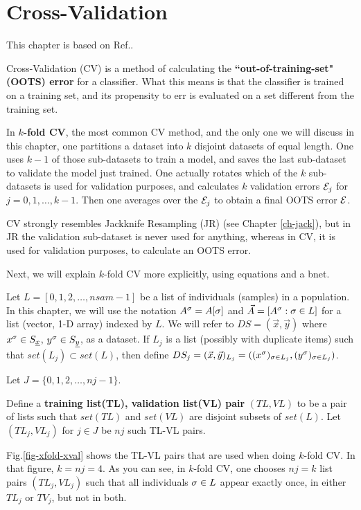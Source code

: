 \chapter{Cross-Validation}
\label{ch-cross-val}

This chapter is based on Ref.\cite{wiki-xval}.

Cross-Validation (CV)
is a method 
of calculating the 
{\bf ``out-of-training-set" (OOTS) error}
for a classifier.
What this means is that the classifier 
is trained on a training set,
and its propensity to err is evaluated
on a set different from the training set.

In {\bf $k$-fold CV}, the most common CV method, 
and the only one we will discuss in this chapter,
one
partitions a  
dataset into $k$ disjoint datasets
of equal length.
One uses $k-1$ of those
sub-datasets to train a model,
and saves the last sub-dataset to
validate the model just trained.
One actually rotates which of 
the $k$ sub-datasets is used 
for validation purposes,
and calculates $k$ validation 
errors ${\cal E}_j$ for $j=0, 1, \ldots, k-1$.
Then one averages over the ${\cal E}_j$
to obtain a final OOTS error ${\cal E}$. 

CV strongly resembles
Jackknife
Resampling (JR) 
(see Chapter \ref{ch-jack}),
but in JR 
the validation sub-dataset is
never used for anything,
whereas in CV,
it is used for validation
purposes, to calculate
an OOTS error.

Next, we will
explain $k$-fold CV more explicitly,
using 
equations and a bnet.


Let $L=[0,1,2, \ldots, nsam-1]$ be a list of
individuals (samples) in a population.
In this chapter, we will use the notation 
$A^\sigma=A[\sigma]$ 
and $\vec{A}=[A^\sigma:\sigma\in L]$
for a  list (vector, 1-D  array) indexed by $L$.
We will refer to $DS=(\vec{x}, \vec{y})$ 
where $x^\sigma\in S_{\underline{x}}$, $y^\sigma\in S_{\underline{y}}$,
as a dataset.
If
$L_j$ is a list (possibly with 
duplicate items)
such that $set(L_j)\subset set(L)$, then
define
$DS_j=(\vec{x}, \vec{y})_{L_j}=
((x^\sigma)_{\sigma\in L_j}, 
(y^\sigma)_{\sigma\in L_j})$.

Let
$J=\{0,1, 2, \ldots, nj-1\}$.

Define a {\bf training list(TL),
validation list(VL) pair} $(TL,VL)$
to be a pair of lists
such that 
$set(TL)$ and $set(VL)$
are disjoint subsets
of $set(L)$.
Let $(TL_j, VL_j)$ for $j\in J$
be $nj$ such TL-VL pairs.


Fig.\ref{fig-xfold-xval} 
shows
the TL-VL pairs 
that are used
when doing $k$-fold 
CV.
In that figure, $k=nj=4$.
As you can see,
in $k$-fold CV, one chooses 
$nj=k$ list pairs $(TL_j, VL_j)$
such that all individuals $\sigma\in L$
appear exactly once, in either
$TL_j$ or $TV_j$, but not in both.

